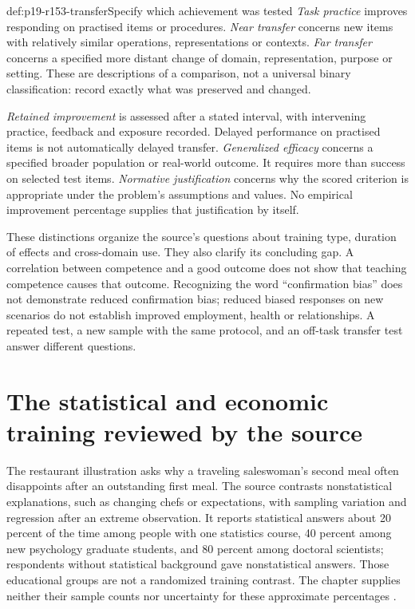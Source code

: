 \begin{hbdefinition}{def:p19-r153-transfer}{Specify which achievement was tested}
\emph{Task practice} improves responding on practised items or procedures.
\emph{Near transfer} concerns new items with relatively similar operations,
representations or contexts. \emph{Far transfer} concerns a specified more
distant change of domain, representation, purpose or setting. These are
descriptions of a comparison, not a universal binary classification:
record exactly what was preserved and changed.

\emph{Retained improvement} is assessed after a stated interval, with
intervening practice, feedback and exposure recorded. Delayed performance
on practised items is not automatically delayed transfer.
\emph{Generalized efficacy} concerns a specified broader population or
real-world outcome. It requires more than success on selected test items.
\emph{Normative justification} concerns why the scored criterion is
appropriate under the problem's assumptions and values. No empirical
improvement percentage supplies that justification by itself.
\end{hbdefinition}

These distinctions organize the source's questions about training type,
duration of effects and cross-domain use. They also clarify its concluding
gap. A correlation between competence and a good outcome does not show
that teaching competence causes that outcome. Recognizing the word
``confirmation bias'' does not demonstrate reduced confirmation bias;
reduced biased responses on new scenarios do not establish improved
employment, health or relationships. A repeated test, a new sample with
the same protocol, and an off-task transfer test answer different questions.

\section{The statistical and economic training reviewed by the source}
\label{sec:p19-r153-statistical-training}

The restaurant illustration asks why a traveling saleswoman's second meal
often disappoints after an outstanding first meal. The source contrasts
nonstatistical explanations, such as changing chefs or expectations, with
sampling variation and regression after an extreme observation. It reports
statistical answers about 20 percent of the time among people with one
statistics course, 40 percent among new psychology graduate students, and
80 percent among doctoral scientists; respondents without statistical
background gave nonstatistical answers. Those educational groups are not
a randomized training contrast. The chapter supplies neither their sample
counts nor uncertainty for these approximate percentages
\cite[p.~803]{DeOliveiraNisbett2021Improve}.

